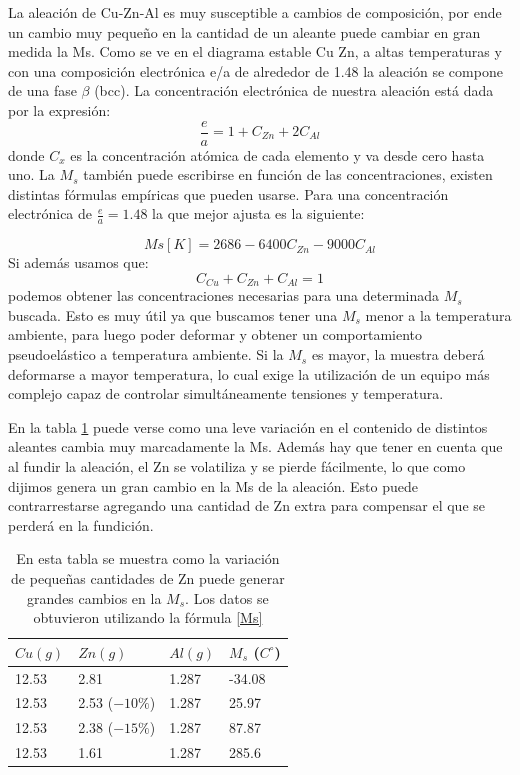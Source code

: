 \documentclass[a4paper,12pt,fleqn,twoside,openany]{book}
\begin{document}
La aleación de Cu-Zn-Al es muy susceptible a cambios de composición, por ende un cambio muy pequeño en la cantidad de un aleante puede cambiar en gran medida la Ms. 
Como se ve en el diagrama estable Cu Zn, a altas temperaturas y con una composición electrónica e/a de alrededor de 1.48 la aleación se compone de una fase $\beta$ (bcc). 
La concentración electrónica de nuestra aleación está dada por la expresión:
\begin{equation}
 \frac{e}{a} = 1+C_{Zn}+2C_{Al}
\end{equation}
donde $C_{x}$ es la concentración atómica de cada elemento y va desde cero hasta uno. La $M_{s}$ también puede escribirse en función de las concentraciones, existen 
distintas fórmulas empíricas que pueden usarse. Para una concentración electrónica de $\frac{e}{a}=1.48$ la que mejor ajusta es la siguiente:

\begin{equation}
Ms[K]=2686-6400C_{Zn}-9000C_{Al} \label{Ms} 
\end{equation}
Si además usamos que:
\begin{equation}
     C_{Cu}+C_{Zn}+C_{Al}=1
\end{equation}
podemos obtener las concentraciones necesarias para una determinada $M_{s}$ buscada. Esto es muy útil ya que buscamos tener una $M_{s}$ menor a la temperatura ambiente, para 
luego poder deformar y obtener un comportamiento pseudoelástico a temperatura ambiente. Si la $M_{s}$ es mayor, la muestra deberá deformarse a mayor temperatura, lo 
cual exige la utilización de un equipo más complejo capaz de controlar simultáneamente tensiones y temperatura.


En la tabla \ref{tab:mstab} puede verse como una leve variación en el contenido de distintos aleantes cambia muy marcadamente la Ms. Además hay que 
tener en cuenta que al fundir la aleación, el Zn se volatiliza y se pierde fácilmente, lo que como dijimos genera un gran cambio en la Ms de la aleación. Esto 
puede contrarrestarse agregando una cantidad de Zn extra para compensar el que se perderá en la fundición.

\begin{table} \label{tab:mstab}
\begin{center}
\begin{tabular}{@{}llll@{}}  \toprule
$Cu (g)$ & $Zn (g)$ & $Al (g)$ & $M_s$ ($C^\circ$)\\ \midrule
12.53 & 2.81  & 1.287 & -34.08\\
12.53 & 2.53 ($-10 \%$) & 1.287 & 25.97\\
12.53 & 2.38 ($-15 \%$) & 1.287 & 87.87\\
12.53 & 1.61 & 1.287 & 285.6 \\
\bottomrule
\end{tabular}
\caption{En esta tabla se muestra como la variación de pequeñas cantidades de Zn puede generar grandes cambios en la $M_s$. Los datos se obtuvieron utilizando 
la fórmula \ref{Ms}}

\end{center}
\end{table}
\end{document}
